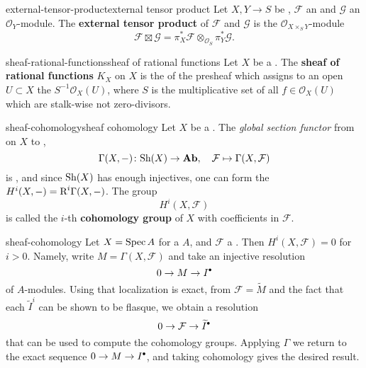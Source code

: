 \begin{topic}{external-tensor-product}{external tensor product}
    Let $X, Y \to S$ be , $\mathcal{F}$ an  and $\mathcal{G}$ an $\mathcal{O}_Y$-module. The \textbf{external tensor product} of $\mathcal{F}$ and $\mathcal{G}$ is the $\mathcal{O}_{X \times_S Y}$-module
    \[ \mathcal{F} \boxtimes \mathcal{G} = \pi_X^* \mathcal{F} \otimes_{\mathcal{O}_S} \pi_Y^* \mathcal{G} . \]
\end{topic}

\begin{topic}{sheaf-rational-functions}{sheaf of rational functions}
    Let $X$ be a . The \textbf{sheaf of rational functions} $K_X$ on $X$ is the  of the presheaf which assigns to an open $U \subset X$ the  $S^{-1} \mathcal{O}_X(U)$, where $S$ is the multiplicative set of all $f \in \mathcal{O}_X(U)$ which are stalk-wise not zero-divisors.
\end{topic}

\begin{topic}{sheaf-cohomology}{sheaf cohomology}
    Let $X$ be a . The \textit{global section functor} from  on $X$ to ,
    \[ \Gamma(X, -) \colon \textup{Sh}(X) \to \textbf{Ab} , \quad \mathcal{F} \mapsto \Gamma(X, \mathcal{F}) \]
    is , and since $\textup{Sh}(X)$ has enough injectives, one can form the  $H^i(X, -) = \textup{R}^i \Gamma(X, -)$. The group
    \[ H^i(X, \mathcal{F}) \]
    is called the $i$-th \textbf{cohomology group} of $X$ with coefficients in $\mathcal{F}$.
\end{topic}

\begin{example}{sheaf-cohomology}
    Let $X = \operatorname{Spec} A$ for a  $A$, and $\mathcal{F}$ a . Then $H^i(X, \mathcal{F}) = 0$ for $i > 0$. Namely, write $M = \Gamma(X, \mathcal{F})$ and take an injective resolution
    \[ 0 \to M \to I^\bdot \]
    of $A$-modules. Using that localization is exact, from $\mathcal{F} = \widetilde{M}$ and the fact that each $\widetilde{I}^i$ can be shown to be flasque, we obtain a resolution
    \[ 0 \to \mathcal{F} \to \widetilde{I}^\bdot \]
    that can be used to compute the cohomology groups. Applying $\Gamma$ we return to the exact sequence $0 \to M \to I^\bdot$, and taking cohomology gives the desired result.
\end{example}

